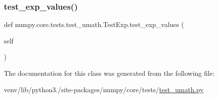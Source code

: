 \subsubsection{\texorpdfstring{test\+\_\+exp\+\_\+values()}{test\_exp\_values()}}
{\footnotesize\ttfamily def numpy.\+core.\+tests.\+test\+\_\+umath.\+Test\+Exp.\+test\+\_\+exp\+\_\+values (\begin{DoxyParamCaption}\item[{}]{self }\end{DoxyParamCaption})}



The documentation for this class was generated from the following file\+:\begin{DoxyCompactItemize}
\item 
venv/lib/python3./site-\/packages/numpy/core/tests/\hyperlink{test__umath_8py}{test\+\_\+umath.\+py}\end{DoxyCompactItemize}
